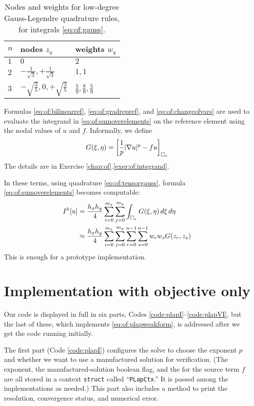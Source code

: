 \begin{table}
\begin{tabular}{lll}
$n$\phantom{foobar} & nodes $z_q$\phantom{foo} & weights $w_q$ \\ \hline
$1$ & $0$ & $2$ \\
$2$ & $-\frac{1}{\sqrt{3}}, +\frac{1}{\sqrt{3}}$ & $1,1$ \\
$3$ & $-\sqrt{\frac{3}{5}}, 0, +\sqrt{\frac{3}{5}}$ & $\frac{5}{9}, \frac{8}{9}, \frac{5}{9}$ \\
\end{tabular}
\caption{Nodes and weights for low-degree Gauss-Legendre quadrature rules, for integrals \eqref{eq:of:gauss}.} \label{tab:of:gauss}
\end{table}

\medskip

Formulas \eqref{eq:of:bilinearref}, \eqref{eq:of:gradrepref}, and \eqref{eq:of:changeofvars} are used to evaluate the integrand in \eqref{eq:of:sumoverelements} on the reference element using the nodal values of $u$ and $f$.  Informally, we define
\begin{equation}
G(\xi,\eta) = \left[\frac{1}{p} |\nabla u|^p - fu\right]_{\square_\ast}  \label{eq:of:integrandheuristic}
\end{equation}
The details are in Exercise \ref{chap:of}.\ref{exer:of:integrand}.

In these terms, using quadrature \eqref{eq:of:tensorgauss}, formula \eqref{eq:of:sumoverelements} becomes computable:
\begin{align}
I^h[u] &= \frac{h_x h_y}{4} \sum_{i=0}^{m_x} \sum_{j=0}^{m_y} \int_{\square_\ast} G(\xi,\eta) \,d\xi\,d\eta \notag \\
       &\approx \frac{h_x h_y}{4} \sum_{i=0}^{m_x} \sum_{j=0}^{m_y} \sum_{r=0}^{n-1} \sum_{s=0}^{n-1} w_r w_s G(z_r,z_s) \label{eq:of:quadraturesumoverelements}
\end{align}
This is enough for a prototype implementation.


\section{Implementation with objective only}

Our code is displayed in full in six parts, Codes \ref{code:plapI}--\ref{code:plapVI}, but the last of these, which implements \eqref{eq:of:plapweakform}, is addressed after we get the code running initially.

The first part (Code \ref{code:plapI}) configures the solve to choose the exponent $p$ and whether we want to use a manufactured solution for verification.  (The exponent, the manufactured-solution boolean flag, and the \pVec for the source term $f$ are all stored in a context \texttt{struct} called ``\texttt{PLapCtx}.''  It is passed among the implementations as needed.)  This part also includes a method to print the resolution, convergence status, and numerical error.

